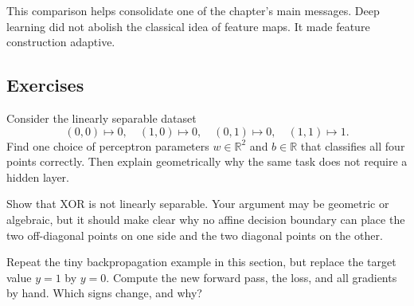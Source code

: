 \medskip

This comparison helps consolidate one of the chapter's main messages.
Deep learning did not abolish the classical idea of feature maps.
It made feature construction adaptive.



\subsection*{Exercises}

\begin{exercise}
Consider the linearly separable dataset
\[
(0,0)\mapsto 0,
\quad
(1,0)\mapsto 0,
\quad
(0,1)\mapsto 0,
\quad
(1,1)\mapsto 1.
\]
Find one choice of perceptron parameters $w\in\mathbb R^2$ and $b\in\mathbb R$ that classifies all four points correctly.
Then explain geometrically why the same task does not require a hidden layer.
\end{exercise}

\begin{exercise}
Show that XOR is not linearly separable.
Your argument may be geometric or algebraic, but it should make clear why no affine decision boundary can place the two off-diagonal points on one side and the two diagonal points on the other.
\end{exercise}

\begin{exercise}
Repeat the tiny backpropagation example in this section, but replace the target value $y=1$ by $y=0$.
Compute the new forward pass, the loss, and all gradients by hand.
Which signs change, and why?
\end{exercise}

